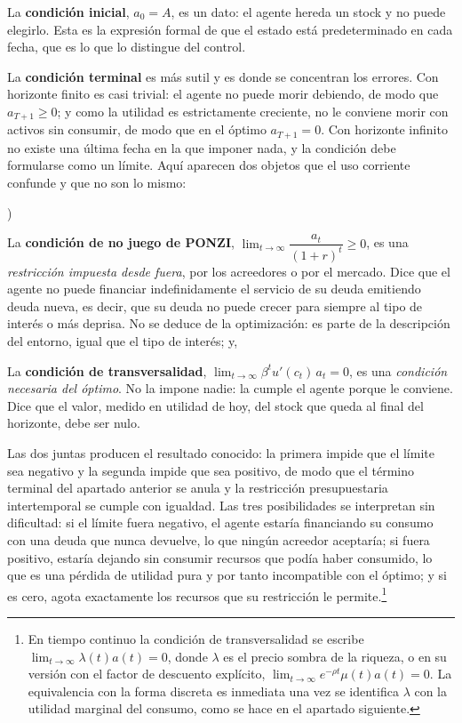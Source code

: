 \documentclass[10pt,a4paper]{article}
\newcounter{alphaitem}
\newenvironment{la}
      {\begin{list}{\alph{alphaitem})}{%
          \usecounter{alphaitem}%
          \setlength{\leftmargin}{1cm}%
          \setlength{\parskip}{3pt}%
          \setlength{\itemsep}{0pt}%
          \setlength{\parsep}{0pt}%
      }}
      {\end{list}}
\begin{document}
La \textbf{condición inicial}, $a_0=A$, es un dato: el agente hereda un stock y no puede elegirlo. Esta es la expresión formal de que el estado está predeterminado en cada fecha, que es lo que lo distingue del control.

La \textbf{condición terminal} es más sutil y es donde se concentran los errores. Con horizonte finito es casi trivial: el agente no puede morir debiendo, de modo que $a_{T+1}\ge 0$; y como la utilidad es estrictamente creciente, no le conviene morir con activos sin consumir, de modo que en el óptimo $a_{T+1}=0$. Con horizonte infinito no existe una última fecha en la que imponer nada, y la condición debe formularse como un límite. Aquí aparecen dos objetos que el uso corriente confunde y que no son lo mismo:
\begin{la}
    \item La \textbf{condición de no juego de PONZI}, $\lim_{t\to\infty}\dfrac{a_t}{(1+r)^t}\ge 0$, es una \textit{restricción impuesta desde fuera}, por los acreedores o por el mercado. Dice que el agente no puede financiar indefinidamente el servicio de su deuda emitiendo deuda nueva, es decir, que su deuda no puede crecer para siempre al tipo de interés o más deprisa. No se deduce de la optimización: es parte de la descripción del entorno, igual que el tipo de interés; y,
    \item La \textbf{condición de transversalidad}, $\lim_{t\to\infty}\beta^t u'(c_t)\,a_t=0$, es una \textit{condición necesaria del óptimo}. No la impone nadie: la cumple el agente porque le conviene. Dice que el valor, medido en utilidad de hoy, del stock que queda al final del horizonte, debe ser nulo.
\end{la}

Las dos juntas producen el resultado conocido: la primera impide que el límite sea negativo y la segunda impide que sea positivo, de modo que el término terminal del apartado anterior se anula y la restricción presupuestaria intertemporal se cumple con igualdad. Las tres posibilidades se interpretan sin dificultad: si el límite fuera negativo, el agente estaría financiando su consumo con una deuda que nunca devuelve, lo que ningún acreedor aceptaría; si fuera positivo, estaría dejando sin consumir recursos que podía haber consumido, lo que es una pérdida de utilidad pura y por tanto incompatible con el óptimo; y si es cero, agota exactamente los recursos que su restricción le permite.\footnote{%
    En tiempo continuo la condición de transversalidad se escribe $\lim_{t\to\infty}\lambda(t)a(t)=0$, donde $\lambda$ es el precio sombra de la riqueza, o en su versión con el factor de descuento explícito, $\lim_{t\to\infty}e^{-\rho t}\mu(t)a(t)=0$. La equivalencia con la forma discreta es inmediata una vez se identifica $\lambda$ con la utilidad marginal del consumo, como se hace en el apartado siguiente.
}
\end{document}
